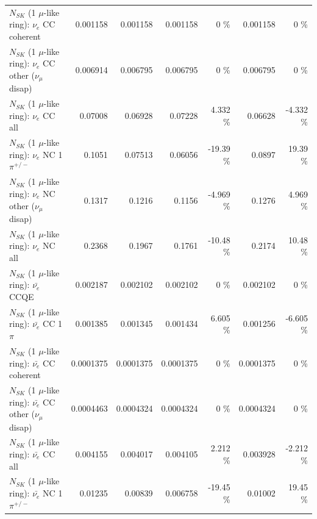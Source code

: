 \begin{table}
\begin{tabular}{| l | r | r | r  r | r  r |}
                               $N_{SK}$ (1 $\mu$-like ring): $\nu_e$ CC coherent &        0.001158 &        0.001158 &        0.001158 &        0 \%  &        0.001158 &        0 \%  \\ 
                $N_{SK}$ (1 $\mu$-like ring): $\nu_e$ CC other ($\nu_\mu$ disap) &        0.006914 &        0.006795 &        0.006795 &        0 \%  &        0.006795 &        0 \%  \\ 
                                  $N_{SK}$ (1 $\mu$-like ring): $\nu_{e}$ CC all &         0.07008 &         0.06928 &         0.07228 &    4.332 \%  &         0.06628 &   -4.332 \%  \\ 
\hline
                           $N_{SK}$ (1 $\mu$-like ring): $\nu_e$ NC 1$\pi^{+/-}$ &          0.1051 &         0.07513 &         0.06056 &   -19.39 \%  &          0.0897 &    19.39 \%  \\ 
                $N_{SK}$ (1 $\mu$-like ring): $\nu_e$ NC other ($\nu_\mu$ disap) &          0.1317 &          0.1216 &          0.1156 &   -4.969 \%  &          0.1276 &    4.969 \%  \\ 
                                  $N_{SK}$ (1 $\mu$-like ring): $\nu_{e}$ NC all &          0.2368 &          0.1967 &          0.1761 &   -10.48 \%  &          0.2174 &    10.48 \%  \\ 
\hline
\hline
\hline
                                $N_{SK}$ (1 $\mu$-like ring): $\bar{\nu_e}$ CCQE &        0.002187 &        0.002102 &        0.002102 &        0 \%  &        0.002102 &        0 \%  \\ 
                           $N_{SK}$ (1 $\mu$-like ring): $\bar{\nu_e}$ CC 1$\pi$ &        0.001385 &        0.001345 &        0.001434 &    6.605 \%  &        0.001256 &   -6.605 \%  \\ 
                         $N_{SK}$ (1 $\mu$-like ring): $\bar{\nu_e}$ CC coherent &       0.0001375 &       0.0001375 &       0.0001375 &        0 \%  &       0.0001375 &        0 \%  \\ 
          $N_{SK}$ (1 $\mu$-like ring): $\bar{\nu_e}$ CC other ($\nu_\mu$ disap) &       0.0004463 &       0.0004324 &       0.0004324 &        0 \%  &       0.0004324 &        0 \%  \\ 
                            $N_{SK}$ (1 $\mu$-like ring): $\bar{\nu_{e}}$ CC all &        0.004155 &        0.004017 &        0.004105 &    2.212 \%  &        0.003928 &   -2.212 \%  \\ 
\hline
                     $N_{SK}$ (1 $\mu$-like ring): $\bar{\nu_e}$ NC 1$\pi^{+/-}$ &         0.01235 &         0.00839 &        0.006758 &   -19.45 \%  &         0.01002 &    19.45 \%  \\ 

\end{tabular}
\end{table}
